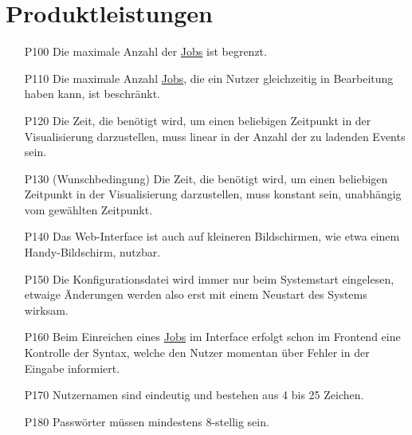 \section{Produktleistungen}

%

\begin{itemize}[noitemsep]
    \item[P100] Die maximale Anzahl der \hyperref[B:Jobs]{Jobs} ist begrenzt.
    
    \item[P110] Die maximale Anzahl \hyperref[B:Jobs]{Jobs}, die ein Nutzer gleichzeitig in Bearbeitung haben kann, ist beschränkt.
    
    \item[P120] Die Zeit, die benötigt wird, um einen beliebigen Zeitpunkt in der Visualisierung darzustellen, muss linear in der Anzahl der zu ladenden Events sein.
    
    \item[P130] (Wunschbedingung)  Die Zeit, die benötigt wird, um einen beliebigen Zeitpunkt in der Visualisierung darzustellen, muss konstant sein, unabhängig vom gewählten Zeitpunkt.
    
    \item[P140] Das \gls{Web-Interface} ist auch auf kleineren Bildschirmen, wie etwa einem Handy-Bildschirm, nutzbar.
    
    \item[P150] Die \gls{Konfigurationsdatei} wird immer nur beim Systemstart eingelesen, etwaige Änderungen werden also erst mit einem Neustart des Systems wirksam.
    
    \item[P160] Beim Einreichen eines \hyperref[B:Jobs]{Jobs} im Interface erfolgt schon im Frontend eine Kontrolle der Syntax, welche den Nutzer momentan über Fehler in der Eingabe informiert.
    
    \item[P170] Nutzernamen sind eindeutig und bestehen aus 4 bis 25 Zeichen.

    \item[P180] Passwörter müssen mindestens 8-stellig sein.
    

\end{itemize}
